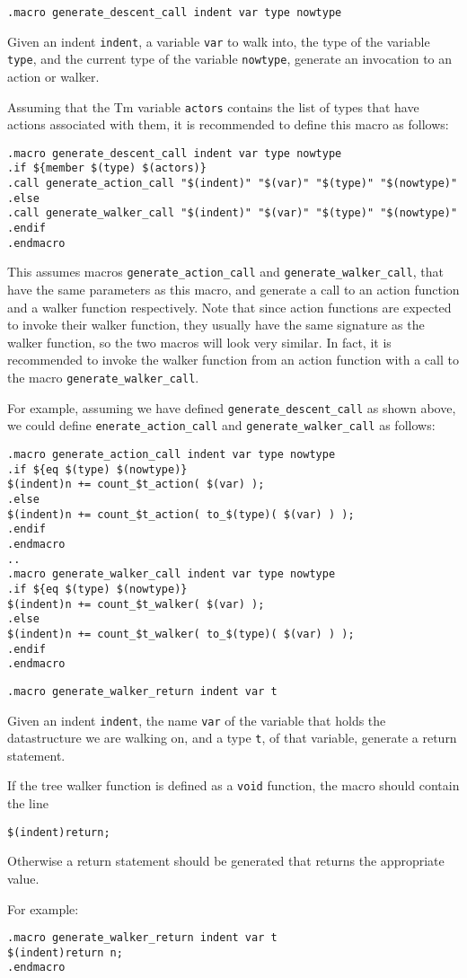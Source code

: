 \begin{verbatim}
.macro generate_descent_call indent var type nowtype
\end{verbatim}
\begin{desc}
Given an indent \verb'indent', a variable \verb'var' to walk into, the
type of the variable \verb'type', and the current type of the variable
\verb'nowtype', generate an invocation to an action or walker.
\par
Assuming that the Tm variable \verb'actors' contains the list of types
that have actions associated with them, it is recommended to define
this macro as follows:
\begin{verbatim}
.macro generate_descent_call indent var type nowtype
.if ${member $(type) $(actors)}
.call generate_action_call "$(indent)" "$(var)" "$(type)" "$(nowtype)"
.else
.call generate_walker_call "$(indent)" "$(var)" "$(type)" "$(nowtype)"
.endif
.endmacro
\end{verbatim}
This assumes macros \verb'generate_action_call' and
\verb'generate_walker_call', that have the same parameters as this
macro, and generate a call to an action function and a walker function
respectively. Note that since action functions are expected to invoke
their walker function, they usually have the same signature as the
walker function, so the two macros will look very similar.  In fact,
it is recommended to invoke the walker function from an action function
with a call to the macro \verb'generate_walker_call'.
\par
For example, assuming we have defined \verb'generate_descent_call' as
shown above, we could define \verb'enerate_action_call' and
\verb'generate_walker_call' as follows:
\begin{verbatim}
.macro generate_action_call indent var type nowtype
.if ${eq $(type) $(nowtype)}
$(indent)n += count_$t_action( $(var) );
.else
$(indent)n += count_$t_action( to_$(type)( $(var) ) );
.endif
.endmacro
..
.macro generate_walker_call indent var type nowtype
.if ${eq $(type) $(nowtype)}
$(indent)n += count_$t_walker( $(var) );
.else
$(indent)n += count_$t_walker( to_$(type)( $(var) ) );
.endif
.endmacro
\end{verbatim}
\end{desc}
\begin{verbatim}
.macro generate_walker_return indent var t
\end{verbatim}
\begin{desc}
Given an indent \verb'indent', the name \verb'var' of the variable that holds
the datastructure we are walking on, and a type \verb't', of that variable,
generate a return statement.
\par
If the tree walker function is defined as a \verb'void' function, the
macro should contain the line
\begin{verbatim}
$(indent)return;
\end{verbatim}
Otherwise a return statement should be generated that returns the
appropriate value.
\par
For example:
\begin{verbatim}
.macro generate_walker_return indent var t
$(indent)return n;
.endmacro
\end{verbatim}
\end{desc}
